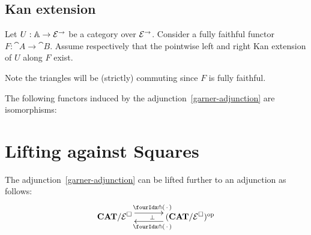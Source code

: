 \documentclass[reqno,10pt,a4paper,oneside]{amsart}
\begin{document}
\subsection{Kan extension}

Let $U : \mathbb{A} \to \mathcal{E}^{\to}$ be a category over $\mathcal{E}^{\to}$.
Consider a fully faithful functor $F : \cat{A} \to \cat{B}$.
Assume respectively that the pointwise left and right Kan extension of $U$ along $F$ exist.
Note the triangles will be (strictly) commuting since $F$ is fully faithful.

\begin{lemma}
\label{kan-extension-closure}
The following functors induced by the adjunction~\eqref{garner-adjunction} are isomorphisms:
\end{lemma}





\section{Lifting against Squares}


\begin{lemma}
The adjunction~\eqref{garner-adjunction} can be lifted further to an adjunction as follows:
\begin{equation}
\label{garner-adjunction-extended}
\begin{gathered}
\xymatrix@C+1em{
  \CAT/\catE^{\Box}
  \ar@<5pt>[r]^{\liftl{\brarghole}}
  \ar@{}[r]|{\bot}
&
  (\CAT/\catE^{\Box})^{\op}
  \ar@<5pt>[l]^{\liftr{\brarghole}}
}
\end{gathered}
\end{equation}
\end{lemma}
\end{document}
